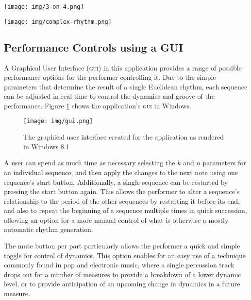 \documentclass{sig-alternate-05-2015}
\begin{document}
\begin{figure*}
\centering
\texttt{[image: img/3-on-4.png]}
\caption{A screenshot from Ableton Live illustrating the relationship between two simple Euclidean sequencers}
\label{3-on-4}
\end{figure*}

\begin{figure*}
\centering
\texttt{[image: img/complex-rhythm.png]}
\caption{A screenshot from Ableton Live illustrating an example of a complex drum machine part created by the Euclidean sequencers}
\label{complex}
\end{figure*}

\subsection{Performance Controls using a GUI}

A Graphical User Interface (\textsc{gui}) in this application provides a range of possible performance options for the performer controlling it. Due to the simple parameters that determine the result of a single Euclidean rhythm, each sequence can be adjusted in real-time to control the dynamics and groove of the performance. Figure \ref{gui} shows the application's \textsc{gui} in Windows.

\begin{figure}
\centering
\texttt{[image: img/gui.png]}
\caption{The graphical user interface created for the application as rendered in Windows 8.1}
\label{gui}
\end{figure}

A user can spend as much time as necessary selecting the $k$ and $n$ parameters for an individual sequence, and then apply the changes to the next note using one sequence's start button. Additionally, a single sequence can be restarted by pressing the start button again. This allows the performer to alter a sequence's relationship to the period of the other sequences by restarting it before its end, and also to repeat the beginning of a sequence multiple times in quick succession, allowing an option for a more manual control of what is otherwise a mostly automatic rhythm generation.

The mute button per part particularly allows the performer a quick and simple toggle for control of dynamics. This option enables for an easy use of a technique commonly found in pop and electronic music, where a single percussion track drops out for a number of measures to provide a breakdown of a lower dynamic level, or to provide anticipation of an upcoming change in dynamics in a future measure. 
\end{document}
